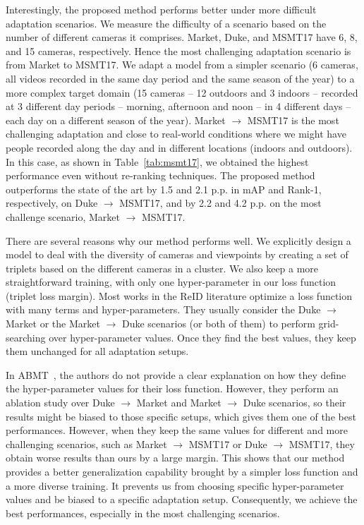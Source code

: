 \documentclass[journal]{IEEEtran}
\begin{document}
Interestingly, the proposed method performs better under more difficult adaptation scenarios. We measure the difficulty of a scenario based on the number of different cameras it comprises. Market, Duke, and MSMT17 have 6, 8, and 15 cameras, respectively. Hence the most challenging adaptation scenario is from Market to MSMT17. We adapt a model from a simpler scenario (6 cameras, all videos recorded in the same day period and the same season of the year) to a more complex target domain (15 cameras -- 12 outdoors and 3 indoors -- recorded at 3 different day periods -- morning, afternoon and noon -- in 4 different days -- each day on a different season of the year). Market $ \rightarrow $ MSMT17 is the most challenging adaptation and close to real-world conditions where we might have people recorded along the day and in different locations (indoors and outdoors). In this case, as shown in Table~\ref{tab:msmt17}, we obtained the highest performance even without re-ranking techniques. The proposed method outperforms the state of the art by 1.5 and 2.1 p.p. in mAP and Rank-1, respectively, on Duke $\rightarrow$ MSMT17, and by 2.2 and 4.2 p.p. on the most challenge scenario, Market $\rightarrow$ MSMT17.

There are several reasons why our method performs well. We explicitly design a model to deal with the diversity of cameras and viewpoints by creating a set of triplets based on the different cameras in a cluster. We also keep a more straightforward training, with only one hyper-parameter in our loss function (triplet loss margin). Most works in the ReID literature optimize a loss function with many terms and hyper-parameters. They usually consider the Duke $\rightarrow$ Market or the Market $\rightarrow $ Duke scenarios (or both of them) to perform grid-searching over hyper-parameter values. Once they find the best values, they keep them unchanged for all adaptation setups. 

In ABMT~\cite{chen2020enhancing}, the authors do not provide a clear explanation on how they define the hyper-parameter values for their loss function. However, they perform an ablation study over Duke $\rightarrow$ Market and Market $\rightarrow $ Duke scenarios, so their results might be biased to those specific setups, which gives them one of the best performances. However, when they keep the same values for different and more challenging scenarios, such as Market $\rightarrow $ MSMT17 or Duke $\rightarrow$ MSMT17, they obtain worse results than ours by a large margin. This shows that our method provides a better generalization capability brought by a simpler loss function and a more diverse training. It prevents us from choosing specific hyper-parameter values and be biased to a specific adaptation setup. Consequently, we achieve the best performances, especially in the most challenging scenarios. 
\end{document}

